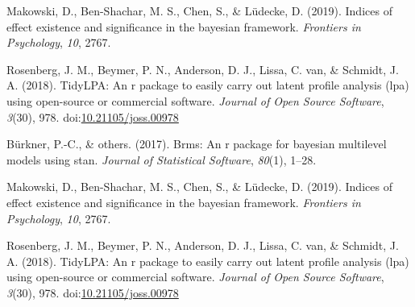 \documentclass[man]{apa6}
\begin{document}
\leavevmode\hypertarget{ref-makowski2019}{}%
Makowski, D., Ben-Shachar, M. S., Chen, S., \& Lüdecke, D. (2019). Indices of effect existence and significance in the bayesian framework. \emph{Frontiers in Psychology}, \emph{10}, 2767.

\leavevmode\hypertarget{ref-R-tidyLPA}{}%
Rosenberg, J. M., Beymer, P. N., Anderson, D. J., Lissa, C. van, \& Schmidt, J. A. (2018). TidyLPA: An r package to easily carry out latent profile analysis (lpa) using open-source or commercial software. \emph{Journal of Open Source Software}, \emph{3}(30), 978. doi:\href{https://doi.org/10.21105/joss.00978}{10.21105/joss.00978}

\leavevmode\hypertarget{ref-burkner2017}{}%
Bürkner, P.-C., \& others. (2017). Brms: An r package for bayesian multilevel models using stan. \emph{Journal of Statistical Software}, \emph{80}(1), 1--28.

\leavevmode\hypertarget{ref-makowski2019}{}%
Makowski, D., Ben-Shachar, M. S., Chen, S., \& Lüdecke, D. (2019). Indices of effect existence and significance in the bayesian framework. \emph{Frontiers in Psychology}, \emph{10}, 2767.

\leavevmode\hypertarget{ref-R-tidyLPA}{}%
Rosenberg, J. M., Beymer, P. N., Anderson, D. J., Lissa, C. van, \& Schmidt, J. A. (2018). TidyLPA: An r package to easily carry out latent profile analysis (lpa) using open-source or commercial software. \emph{Journal of Open Source Software}, \emph{3}(30), 978. doi:\href{https://doi.org/10.21105/joss.00978}{10.21105/joss.00978}

\endgroup
\end{document}
